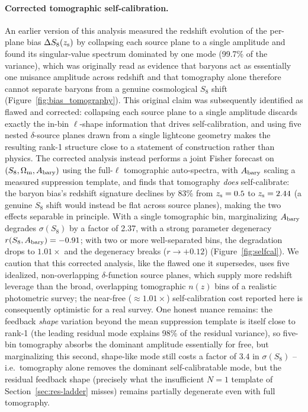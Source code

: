 \documentclass[11pt]{article}
\newcommand{\zs}{z_{\rm s}}
\begin{document}
\paragraph{Corrected tomographic self-calibration.} An earlier version of
this analysis measured the redshift evolution of the per-plane bias
$\Delta S_8(\zs)$ by collapsing each source plane to a single amplitude and
found its singular-value spectrum dominated by one mode (99.7\% of the
variance), which was originally read as evidence that baryons act as
essentially one nuisance amplitude across redshift and that tomography alone
therefore cannot separate baryons from a genuine cosmological $S_8$ shift
(Figure~\ref{fig:bias_tomography}). This original claim was subsequently
identified as flawed and corrected: collapsing each source plane to a single
amplitude discards exactly the in-bin $\ell$-shape information that drives
self-calibration, and using five nested $\delta$-source planes drawn from a
single lightcone geometry makes the resulting rank-1 structure close to a
statement of construction rather than physics. The corrected analysis
instead performs a joint Fisher forecast on $(S_8,\Omega_{\rm m},A_{\rm bary})$
using the full-$\ell$ tomographic auto-spectra, with $A_{\rm bary}$ scaling a
measured suppression template, and finds that tomography \emph{does}
self-calibrate: the baryon bias's redshift signature declines by 83\% from
$\zs=0.5$ to $\zs=2.44$ (a genuine $S_8$ shift would instead be flat across
source planes), making the two effects separable in principle. %
With a single tomographic bin, marginalizing $A_{\rm bary}$ degrades
$\sigma(S_8)$ by a factor of 2.37, with a strong parameter degeneracy
$r(S_8,A_{\rm bary})=-0.91$; with two or more well-separated bins, the
degradation drops to $1.01\times$ and the degeneracy breaks
($r\to+0.12$) (Figure~\ref{fig:selfcal}). We caution that this corrected
analysis, like the flawed one it supersedes, uses five idealized,
non-overlapping $\delta$-function source planes, which supply more
redshift leverage than the broad, overlapping tomographic $n(z)$ bins of a
realistic photometric survey; the near-free ($\approx1.01\times$)
self-calibration cost reported here is consequently optimistic for a real
survey. %
One honest nuance remains: the feedback \emph{shape} variation beyond the
mean suppression template is itself close to rank-1 (the leading residual
mode explains 98\% of the residual variance), so five-bin tomography absorbs
the dominant amplitude essentially for free, but marginalizing this second,
shape-like mode still costs a factor of $3.4$ in $\sigma(S_8)$ -- i.e.\
tomography alone removes the dominant self-calibratable mode, but the
residual feedback shape (precisely what the insufficient $N=1$ template of
Section~\ref{sec:res-ladder} misses) remains partially degenerate even with
full tomography. %
\end{document}
